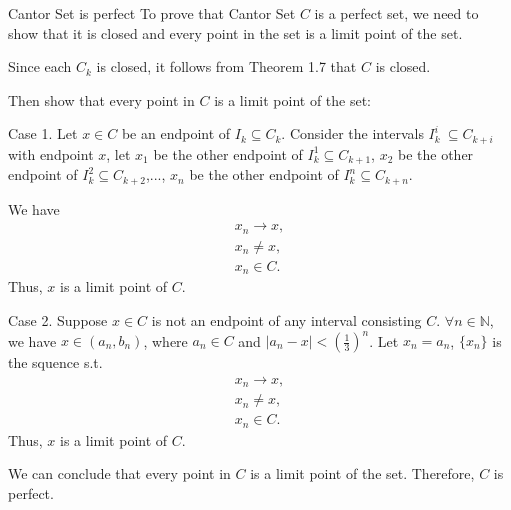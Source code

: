 \documentclass[UTF8,a4paper,10pt]{article}
\begin{document}
  \begin{mybox}{Cantor Set is perfect}
    To prove that Cantor Set \(C\) is a perfect set, we need to show that it is closed and every point in the set is a limit point of the set.

    Since each \(C_k\) is closed, it follows from Theorem 1.7 that \(C\) is closed. 

    Then show that every point in \(C\) is a limit point of the set:

    Case 1. Let \(x\in C\) be an endpoint of \(I_k\subseteq C_k\). Consider the intervals \(I_k^i\ \subseteq C_{k+i}\) with endpoint \(x\), let \(x_1\) be the other endpoint of \(I_k^1\subseteq C_{k+1}\), \(x_2\) be the other endpoint of \(I_k^2\subseteq C_{k+2}\),..., \(x_n\) be the other endpoint of \(I_k^n
    \subseteq C_{k+n}\).

    We have 
    \begin{equation*}
      \begin{aligned}
        x_n\to x,\\
        x_n \neq x,\\
        x_n \in C.
      \end{aligned}
    \end{equation*}
    Thus, \(x\) is a limit point of \(C\).

    Case 2. Suppose \(x\in C\) is not an endpoint of any interval consisting \(C\). \(\forall n\in\mathbb{N}\), we have \(x\in (a_n, b_n)\), where \(a_n\in C\) and \(|a_n-x|<(\frac{1}{3})^{n}\). Let \(x_n = a_n\), \(\{x_n\}\) is the squence s.t. 
    \begin{equation*}
      \begin{aligned}
        x_n\to x,\\
        x_n \neq x,\\
        x_n \in C.
      \end{aligned}
    \end{equation*}
    Thus, \(x\) is a limit point of \(C\).

    We can conclude that every point in \(C\) is a limit point of the set. Therefore, \(C\) is perfect.

    
  \end{mybox}


  \begin{solution}

    \begin{equation*}
      \begin{aligned}
      \end{aligned}
    \end{equation*}
 

  \end{solution}
  \pagebreak
\end{document}
